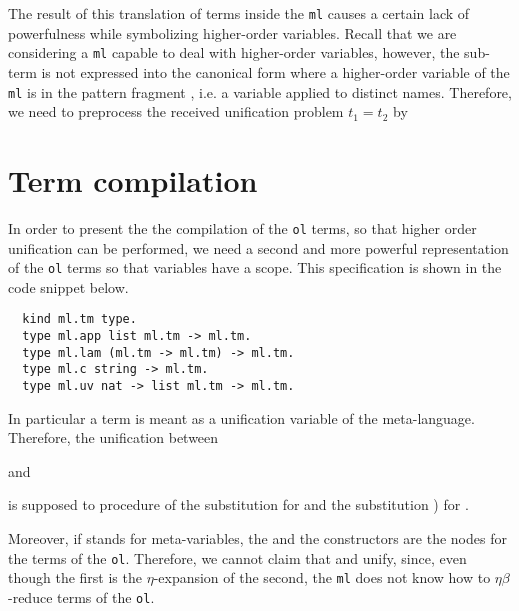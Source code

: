 \documentclass[acmengage]{acmart}
\newcommand*{\acronym}[1]{\texttt{#1}\xspace}
\def\ol{\acronym{ol}} %
\def\ml{\acronym{ml}} %
\begin{document}
The result of this translation of terms inside the \ml causes a certain lack of
powerfulness while symbolizing higher-order variables. Recall that we are
considering a \ml capable to deal with higher-order variables, however, the
sub-term  is not expressed into the canonical form where a
higher-order variable of the \ml is in the pattern fragment \cite{miller1991},
i.e. a variable applied to distinct names. Therefore, we need to preprocess the
received unification problem $t_1 = t_2$ by 
 
\section{Term compilation}

In order to present the the compilation of the \ol terms, so that higher order
unification can be performed, we need a second and more powerful representation
of the \ol terms so that variables have a scope. This specification is shown
in the code snippet below.  

\begin{verbatim}
  kind ml.tm type.
  type ml.app list ml.tm -> ml.tm.
  type ml.lam (ml.tm -> ml.tm) -> ml.tm.
  type ml.c string -> ml.tm.
  type ml.uv nat -> list ml.tm -> ml.tm.
\end{verbatim}

\noindent In particular a  term is meant as a unification variable
of the meta-language. Therefore, the unification between 


and


is supposed to procedure of the substitution  for  and the substitution ) for
.

Moreover, if  stands for meta-variables, the  and the
 constructors are the nodes for the terms of the \ol. Therefore, we
cannot claim that  and 
unify, since, even though the first is the $\eta$-expansion of the second, the
\ml does not know how to $\eta\beta$-reduce terms of the \ol.
\end{document}

